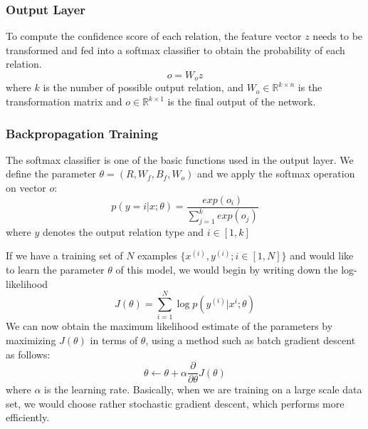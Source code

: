 \documentclass[12pt, a4paper, UTF8]{article}
\begin{document}
	\subsubsection{Output Layer}
	\noindent To compute the confidence score of each relation, the feature vector $z$ needs to be transformed and fed into a softmax classifier to obtain the probability of each relation.
	\begin{equation}
	o = W_o z
	\end{equation}
	where $k$ is the number of possible output relation, and $W_o \in \mathbb{R}^{k \times n}$ is the transformation matrix and $o \in \mathbb{R}^{k \times 1}$ is the final output of the network.
	
	\subsubsection{Backpropagation Training}
	\noindent The softmax classifier is one of the basic functions used in the output layer. We define the parameter $\theta = (R, W_f, B_f, W_o)$ and we apply the softmax operation on vector $o$:
	\begin{equation}
	p(y=i|x;\theta) = \frac{exp(o_i)}{\sum_{j=1}^{k}exp(o_j)}
	\end{equation}
	where $y$ denotes the output relation type and $i \in [1,k]$
	\par If we have a training set of $N$ examples $\{x^{(i)},y^{(i)};i \in \left[1,N\right]\}$ and would like to learn the parameter $\theta$ of this model, we would begin by writing down the log-likelihood
	\begin{equation}
	J(\theta) = \sum_{i=1}^{N}\log p(y^{(i)}|x^{i};\theta)
	\end{equation}
	We can now obtain the maximum likelihood estimate of the parameters by maximizing $J(\theta)$ in terms of $\theta$, using a method such as batch gradient descent as follows:
	\begin{equation}
	\theta \leftarrow \theta + \alpha\frac{\partial }{\partial\theta}J(\theta)
	\end{equation}
	where $\alpha$ is the learning rate. Basically, when we are training on a large scale data set, we would choose rather stochastic gradient descent, which performs more efficiently.	
	
\end{document}
